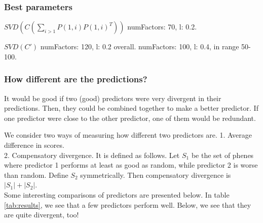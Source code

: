\documentclass{report}
\begin{document}
\subsubsection{Best parameters}
$SVD(C(\sum_{i>1} P(1,i)P(1,i)^T))$ numFactors: 70, l: 0.2.

$SVD(C')$ numFactors: 120, l: 0.2 overall. numFactors: 100, l: 0.4, in range 50-100.

\subsubsection{How different are the predictions?}
It would be good if two (good) predictors were very divergent in their predictions. Then, they could be combined together to make a better predictor. If one predictor were close to the other predictor, one of them would be redundant. 

We consider two ways of measuring how different two predictors are. 1. Average difference in scores. \\
2. Compensatory divergence. It is defined as follows. Let $S_1$ be the set of phenes where predictor 1 performs at least as good as random, while predictor 2 is worse than random. Define $S_2$ symmetrically. Then compensatory divergence is $|S_1| + |S_2|$.\\

Some interesting comparisons of predictors are presented below. In table \ref{tab:results}, we see that a few predictors perform well. Below, we see that they are quite divergent, too!
\end{document}
